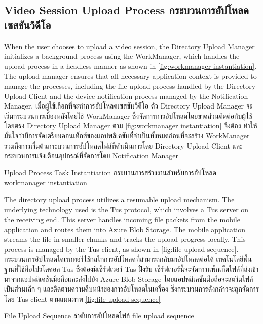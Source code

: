 \subsection{\ifenglish Video Session Upload Process \else กระบวนการอัปโหลดเซสชันวิดีโอ \fi}

\ifenglish
When the user chooses to upload a video session, the Directory Upload Manager initializes a background process using the WorkManager, which handles the upload process in a headless manner as shown in \autoref{fig:workmanager instantiation}. The upload manager ensures that all necessary application context is provided to manage the processes, including the file upload process handled by the Directory Upload Client and the device notification process managed by the Notification Manager.
\else
เมื่อผู้ใช้เลือกที่จะทำการอัปโหลดเซสชันวิดีโอ ตัว Directory Upload Manager จะเริ่มกระบวนการเบื้องหลังโดยใช้ WorkManager ซึ่งจัดการการอัปโหลดโดยขาดส่วนติดต่อกับผู้ใช้โดยตรง Directory Upload Manager ตาม \autoref{fig:workmanager instantiation} จึงต้อง ทำให้มั่นใจว่ามีการจัดเตรียมคอนเท็กซ์ของแอปพลิเคชันที่จำเป็นทั้งหมดก่อนที่จะสร้าง WorkManager รวมถึงการเริ่มต้นกระบวนการอัปโหลดไฟล์ที่ดำเนินการโดย Directory Upload Client และกระบวนการแจ้งเตือนอุปกรณ์ที่จัดการโดย Notification Manager
\fi

{\ifenglish Upload Process Task Instantiation \else กระบวนการสร้างงานสำหรับการอัปโหลด \fi}
{workmanager instantiation}

\ifenglish
The directory upload process utilizes a resumable upload mechanism. The underlying technology used is the Tus protocol, which involves a Tus server on the receiving end. This server handles incoming file packets from the mobile application and routes them into Azure Blob Storage. The mobile application streams the file in smaller chunks and tracks the upload progress locally. This process is managed by the Tus client, as shown in \autoref{fig:file upload sequence}.
\else
กระบวนการอัปโหลดไดเรกทอรีใช้กลไกการอัปโหลดที่สามารถกลับมาอัปโหลดต่อได้ เทคโนโลยีพื้นฐานที่ใช้คือโปรโตคอล Tus ซึ่งต้องมีเซิร์ฟเวอร์ Tus ฝั่งรับ เซิร์ฟเวอร์นี้จะจัดการแพ็กเก็ตไฟล์ที่ส่งเข้ามาจากแอปพลิเคชันมือถือและส่งไปยัง Azure Blob Storage โดยแอปพลิเคชันมือถือจะสตรีมไฟล์เป็นส่วนเล็ก ๆ และติดตามความคืบหน้าของการอัปโหลดในเครื่อง ซึ่งกระบวนการดังกล่าวจะถูกจัดการโดย Tus client ตามแผนภาพ \autoref{fig:file upload sequence}
\fi

{\ifenglish File Upload Sequence \else ลำดับการอัปโหลดไฟล์ \fi}
{file upload sequence}

